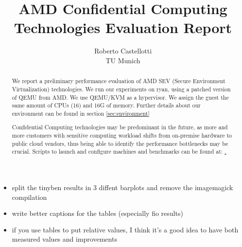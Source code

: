 \documentclass[twocolumn]{article}
\begin{document}
\date{}
\title{\Large \bf AMD Confidential Computing Technologies Evaluation Report}
\author{{\rm Roberto Castellotti}\\TU Munich}
\maketitle

\begin{itemize}
    \item split the tinyben results in 3 diffent barplots and remove the imagemagick compilation
    \item write better captions for the tables (especially fio results)
    \item if you use tables to put relative values, I think it’s a good idea to have both measured values and improvements
\end{itemize}

\begin{abstract}
    We report a preliminary performance evaluation of AMD SEV (Secure Environment Virtualization) technologies.
    We run our experiments on ryan, using a patched version of QEMU from AMD. We use QEMU/KVM as a hypervisor. We assign the guest the same amount of CPUs (16) and 16G of memory. Further details about our environment can be found in section \ref{sec:environment}

    Confidential Computing technologies may be predominant in the future, as more and more customers with sensitive computing workload shifts from on-premise hardware to public cloud vendors, thus being able to identify the performance bottlenecks may be crucial. Scripts to launch and configure machines and benchmarks can be found at: \href{https://github.com/rcastellotti/gr}.  
\end{abstract}
\end{document}
